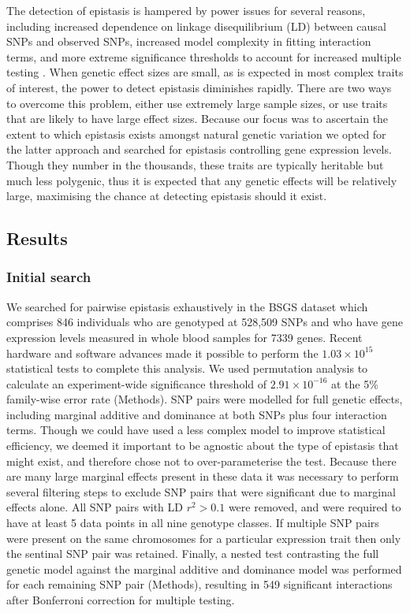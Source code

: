 \documentclass{article}
\begin{document}
The detection of epistasis is hampered by power issues for several reasons, including increased dependence on linkage disequilibrium (LD) between causal SNPs and observed SNPs, increased model complexity in fitting interaction terms, and more extreme significance thresholds to account for increased multiple testing \cite{Hemani2013}. When genetic effect sizes are small, as is expected in most complex traits of interest, the power to detect epistasis diminishes rapidly. There are two ways to overcome this problem, either use extremely large sample sizes, or use traits that are likely to have large effect sizes. Because our focus was to ascertain the extent to which epistasis exists amongst natural genetic variation we opted for the latter approach and searched for epistasis controlling gene expression levels. Though they number in the thousands, these traits are typically heritable but much less polygenic, thus it is expected that any genetic effects will be relatively large, maximising the chance at detecting epistasis should it exist.


\subsection{Results}

\subsubsection{Initial search}
We searched for pairwise epistasis exhaustively in the BSGS dataset which comprises 846 individuals who are genotyped at 528,509 SNPs and who have gene expression levels measured in whole blood samples for 7339 genes. Recent hardware and software advances made it possible to perform the $1.03 \times 10^{15}$ statistical tests to complete this analysis. We used permutation analysis to calculate an experiment-wide significance threshold of $2.91 \times 10^{-16}$ at the 5\% family-wise error rate (Methods). SNP pairs were modelled for full genetic effects, including marginal additive and dominance at both SNPs plus four interaction terms. Though we could have used a less complex model to improve statistical efficiency, we deemed it important to be agnostic about the type of epistasis that might exist, and therefore chose not to over-parameterise the test. Because there are many large marginal effects present in these data it was necessary to perform several filtering steps to exclude SNP pairs that were significant due to marginal effects alone. All SNP pairs with LD $r^2 > 0.1$ were removed, and were required to have at least 5 data points in all nine genotype classes. If multiple SNP pairs were present on the same chromosomes for a particular expression trait then only the sentinal SNP pair was retained. Finally, a nested test contrasting the full genetic model against the marginal additive and dominance model was performed for each remaining SNP pair (Methods), resulting in 549 significant interactions after Bonferroni correction for multiple testing.
\end{document}
